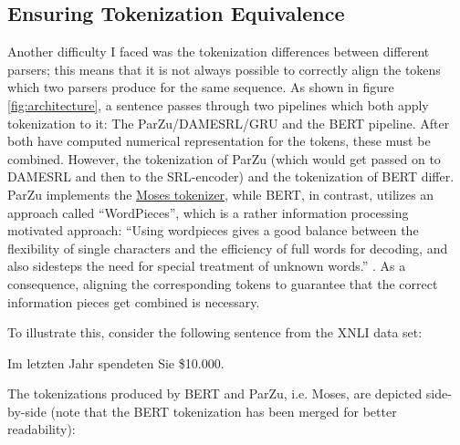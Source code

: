 \subsection{Ensuring Tokenization Equivalence}

Another difficulty I faced was the tokenization differences between different
parsers; this means that it is not always possible to correctly align the tokens
which two parsers produce for the same sequence.
As shown in figure \ref{fig:architecture}, a sentence passes through two pipelines which both
apply tokenization to it: The ParZu/DAMESRL/GRU and the BERT pipeline. After both have computed
numerical representation for the tokens, these must be combined. However, the tokenization of
ParZu (which would get passed on to DAMESRL and then to the SRL-encoder) and the tokenization of
BERT differ. ParZu implements the \href{http://www.statmt.org/moses/}{Moses tokenizer}, while
BERT, in contrast, utilizes an approach called ``WordPieces'', which is a rather information
processing motivated approach: ``Using wordpieces gives a good balance between the flexibility
of single characters and the efficiency of full words for decoding, and also sidesteps the need
for special treatment of unknown words.'' \citep[p.~2]{wu2016google}. As a consequence, aligning the
corresponding tokens to guarantee that the correct information pieces get combined is
necessary.

To illustrate this, consider the following sentence from the XNLI data set:

\begin{examples}
	\item Im letzten Jahr spendeten Sie \$10.000.
\end{examples}

The tokenizations produced by BERT and ParZu, i.e. Moses, are
depicted side-by-side (note that the BERT tokenization has been
merged for better readability):

